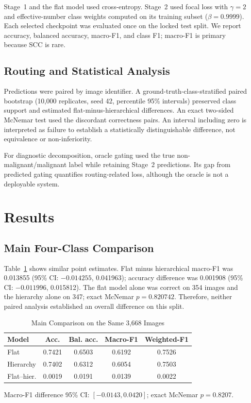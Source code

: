 \documentclass[a4paper,conference]{IEEEtran}
\begin{document}
Stage~1 and the flat model used cross-entropy. Stage~2 used focal loss
\cite{lin2017} with $\gamma=2$ and effective-number class weights
\cite{cui2019} computed on its training subset ($\beta=0.9999$). Each selected
checkpoint was evaluated once on the locked test split. We report accuracy,
balanced accuracy, macro-F1, and class F1; macro-F1 is primary because SCC is
rare.

\subsection{Routing and Statistical Analysis}
Predictions were paired by image identifier. A ground-truth-class-stratified
paired bootstrap (10,000 replicates, seed 42, percentile 95\% intervals)
preserved class support and estimated flat-minus-hierarchical differences. An
exact two-sided McNemar test used the discordant correctness pairs. An interval
including zero is interpreted as failure to establish a statistically
distinguishable difference, not equivalence or non-inferiority.

For diagnostic decomposition, oracle gating used the true
non-malignant/malignant label while retaining Stage~2 predictions. Its gap from
predicted gating quantifies routing-related loss, although the oracle is not a
deployable system.

\section{Results}
\subsection{Main Four-Class Comparison}
Table~\ref{tab:main} shows similar point estimates. Flat minus hierarchical
macro-F1 was 0.013855 (95\% CI: $-0.014255$, 0.041963); accuracy difference
was 0.001908 (95\% CI: $-0.011996$, 0.015812). The flat model alone was correct
on 354 images and the hierarchy alone on 347; exact McNemar $p=0.820742$.
Therefore, neither paired analysis established an overall difference on this
split.

\begin{table}[t]
\caption{Main Comparison on the Same 3,668 Images}
\label{tab:main}
\centering
\setlength{\tabcolsep}{3.1pt}
\begin{tabular}{lcccc}
\toprule
Model & Acc. & Bal. acc. & Macro-F1 & Weighted-F1\\
\midrule
Flat & 0.7421 & 0.6503 & 0.6192 & 0.7526\\
Hierarchy & 0.7402 & 0.6312 & 0.6054 & 0.7503\\
\midrule
Flat--hier. & 0.0019 & 0.0191 & 0.0139 & 0.0022\\
\bottomrule
\end{tabular}
\vspace{2pt}
\parbox{0.98\columnwidth}{\footnotesize Macro-F1 difference 95\% CI:
$[-0.0143,0.0420]$; exact McNemar $p=0.8207$.}
\end{table}
\end{document}
